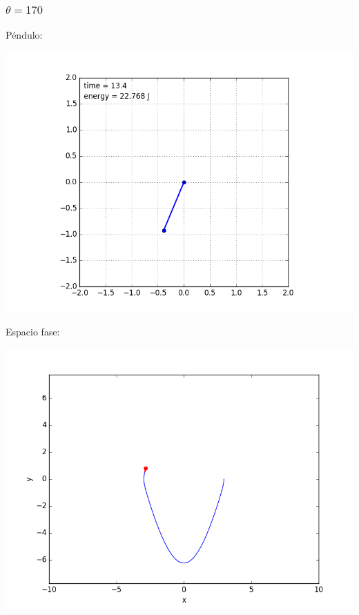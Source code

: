 \documentclass[12pt,letterpaper]{article}
\begin{document}
\subsubsection*{$\theta = 170$}
Péndulo:
\begin{center}
\includegraphics[scale=0.3]{170.png}
\end{center}
Espacio fase:
\begin{center}
\includegraphics[scale=0.3]{1701_.png}
\end{center}
\end{document}
